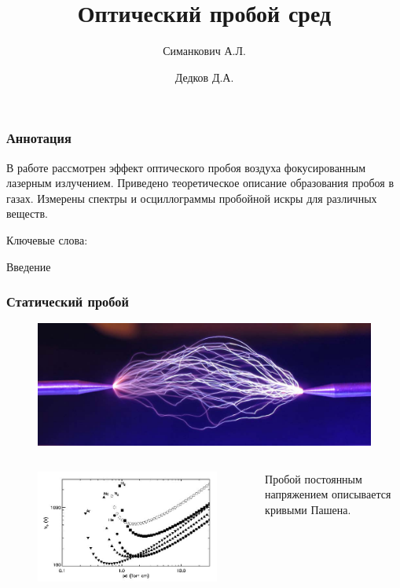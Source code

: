 \documentclass{beamer}
\title[About Beamer] %
{Оптический пробой сред}
\author[Arthur, Doe] %
{Симанкович А.Л. \and Дедков Д.А. }
\institute[VFU] %
{
	Московский Физико-Технический Институт
}
\date[VLC 2023] %
\begin{document}
	
	\frame{\titlepage}
	
	\begin{frame}
		\frametitle{Аннотация}
				
		В работе рассмотрен эффект оптического пробоя воздуха фокусированным лазерным излучением. Приведено теоретическое описание образования пробоя в газах. Измерены спектры и осциллограммы пробойной искры для различных веществ.
		
		Ключевые слова:
	\end{frame}


	\begin{frame}[plain,c]
		
		\begin{center}
			\huge {} Введение
		\end{center}
	
	\end{frame}
	
	
	\begin{frame}
		\frametitle{Статический пробой}

		\begin{figure}
			\includegraphics[width=0.8\linewidth]{res/const_discharge.jpg}
		\end{figure}
		
		\begin{columns}
			\begin{figure}
				\includegraphics[width=\linewidth]{res/paschen.jpg}
			\end{figure}

			Пробой постоянным напряжением описывается кривыми Пашена.
		\end{columns}

	\end{frame}
\end{document}
